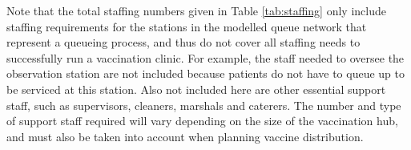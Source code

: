 \documentclass{article}
\begin{document}
\begin{table}[!h]

\caption{\label{tab:staffing}Staff numbers by station for low, medium and high staffing availability}
\end{table}

Note that the total staffing numbers given in Table \ref{tab:staffing}
only include staffing requirements for the stations in the modelled
queue network that represent a queueing process, and thus do not cover
all staffing needs to successfully run a vaccination clinic. For
example, the staff needed to oversee the observation station are not
included because patients do not have to queue up to be serviced at this
station. Also not included here are other essential support staff, such
as supervisors, cleaners, marshals and caterers. The number and type of
support staff required will vary depending on the size of the
vaccination hub, and must also be taken into account when planning
vaccine distribution.
\end{document}
